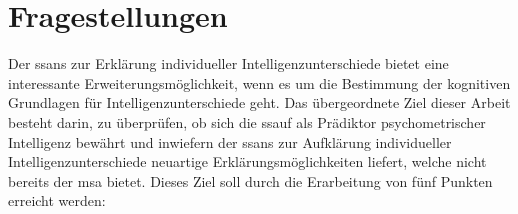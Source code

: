 \documentclass[11pt, twoside, a4paper]{book}		%
\begin{document}
\section{Fragestellungen \label{sec:Fragestellungen}}

Der \gls{ssans} zur Erklärung individueller Intelligenzunterschiede \citep{Melnick2013} bietet eine interessante Erweiterungsmöglichkeit, wenn es um die Bestimmung der kognitiven Grundlagen für Intelligenzunterschiede geht. Das übergeordnete Ziel dieser Arbeit besteht darin, zu überprüfen, ob sich die \gls{ssauf} als Prädiktor psychometrischer Intelligenz bewährt und inwiefern der \gls{ssans} zur Aufklärung individueller Intelligenzunterschiede neuartige Erklärungsmöglichkeiten liefert, welche nicht bereits der \gls{msa} \citep[z.~B.][]{Deary2000a, Jensen1982a, Jensen1982b, Jensen2006, Vernon1983} bietet. Dieses Ziel soll durch die Erarbeitung von fünf Punkten erreicht werden:
\end{document}
